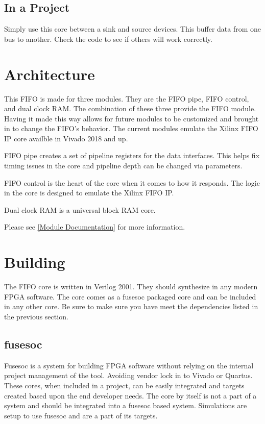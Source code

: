 

\subsection{In a Project}
\par
Simply use this core between a sink and source devices. This buffer data from one bus to another. Check the code to see if others will work correctly.

\section{Architecture}

\par
This FIFO is made for three modules. They are the FIFO pipe, FIFO control, and dual clock RAM. The combination of these three provide the FIFO module.
Having it made this way allows for future modules to be customized and brought in to change the FIFO's behavior. The current modules emulate the Xilinx
FIFO IP core availble in Vivado 2018 and up.

\par
FIFO pipe creates a set of pipeline registers for the data interfaces. This helps fix timing issues in the core and pipeline depth can be changed via parameters.

\par
FIFO control is the heart of the core when it comes to how it responds. The logic in the core is designed to emulate the Xilinx FIFO IP.

\par
Dual clock RAM is a universal block RAM core.

Please see \ref{Module Documentation} for more information.

\section{Building}

\par
The FIFO core is written in Verilog 2001. They should synthesize in any modern FPGA software. The core comes as a fusesoc packaged core and can be
included in any other core. Be sure to make sure you have meet the dependencies listed in the previous section.

\subsection{fusesoc}
\par
Fusesoc is a system for building FPGA software without relying on the internal project management of the tool. Avoiding vendor lock in to Vivado or Quartus.
These cores, when included in a project, can be easily integrated and targets created based upon the end developer needs. The core by itself is not a part of
a system and should be integrated into a fusesoc based system. Simulations are setup to use fusesoc and are a part of its targets.

